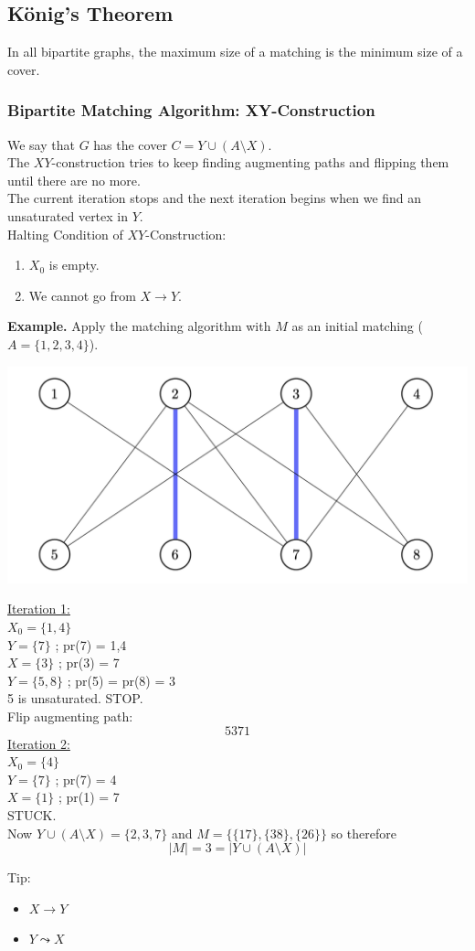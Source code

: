 \documentclass[11pt]{article}
\newenvironment{eg}[1]{
\begin{tcolorbox}[colback = white!15, arc=0pt,outer arc=0pt, colframe = black]
{\color{black} \textbf{Example.} #1} \\[5pt]
}
{
\end{tcolorbox}
}
\newcommand{\nl}{\\[5pt]}
\newcommand{\lstspacing}{\setlength\itemsep{1pt}}
\begin{document}
\subsection{K\"onig's Theorem}

In all bipartite graphs, the maximum size of a matching is the minimum size of a cover.

\subsubsection{Bipartite Matching Algorithm: XY-Construction}
We say that $G$ has the cover $C = Y \cup (A \setminus X)$. \nl 
The $XY$-construction tries to keep finding augmenting paths and flipping them until there are no more. \nl 
The current iteration stops and the next iteration begins when we find an unsaturated vertex in $Y$. \nl 
Halting Condition of $XY$-Construction: 
\begin{enumerate}[(1)]
    \item $X_0$ is empty. 
    \item We cannot go from $X \rightarrow Y$.  
\end{enumerate} 
\begin{eg}{Apply the matching algorithm with $M$ as an initial matching ($A = \{1,2,3,4\}$).}
\vspace{-20pt}
\begin{center}
    \includegraphics[scale=0.40]{Figures/XYConstruct.png}
\end{center}
\vspace{-15pt}
\underline{Iteration 1:} \nl
$X_0 = \{1, 4\}$ \nl 
$Y = \{7\}$ ; pr(7) = 1,4 \nl 
$X = \{3\}$ ; pr(3) = 7 \nl 
$Y = \{5, 8 \}$ ; pr(5) = pr(8) = 3 \nl
5 is unsaturated. STOP. \nl Flip augmenting path: $$5371$$
\underline{Iteration 2:} \nl
$X_0 = \{4\}$ \nl
$Y = \{7\}$ ; pr(7) = 4 \nl
$X = \{1\}$ ; pr(1) = 7 \nl
STUCK.\nl 
Now $Y \cup (A \setminus X) = \{2, 3, 7\}$ and $M = \{\{17\}, \{38\}, \{26\}\}$ so therefore
$$|M| = 3 = |Y \cup (A \setminus X)|$$
\end{eg}
Tip:
\begin{itemize}
    \lstspacing
    \item $X \rightarrow Y$ 
    \item $Y \leadsto X$
\end{itemize}  
\end{document}
